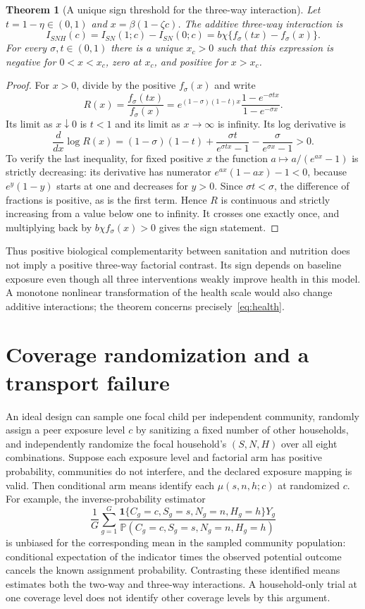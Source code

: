 \documentclass[11pt,a4paper]{article}
\newtheorem{theorem}{Theorem}[section]
\theoremstyle{definition}
\theoremstyle{remark}
\newcommand{\Prb}{\mathbb P}
\newcommand{\ind}{\mathbf 1}
\begin{document}
\begin{theorem}[A unique sign threshold for the three-way interaction]\label{th:three}
Let $t=1-\eta\in(0,1)$ and $x=\beta(1-\zeta c)$. The additive three-way interaction is
\[
 I_{SNH}(c)=I_{SN}(1;c)-I_{SN}(0;c)
          =b\chi\{f_\sigma(tx)-f_\sigma(x)\}.
\]
For every $\sigma,t\in(0,1)$ there is a unique $x_c>0$ such that this expression is negative for $0<x<x_c$, zero at $x_c$, and positive for $x>x_c$.
\end{theorem}
\begin{proof}
For $x>0$, divide by the positive $f_\sigma(x)$ and write
\[
 R(x)=\frac{f_\sigma(tx)}{f_\sigma(x)}
 =e^{(1-\sigma)(1-t)x}
       \frac{1-e^{-\sigma tx}}{1-e^{-\sigma x}}.
\]
Its limit as $x\downarrow0$ is $t<1$ and its limit as $x\to\infty$ is infinity. Its log derivative is
\[
 \frac{d}{dx}\log R(x)
 =(1-\sigma)(1-t)+\frac{\sigma t}{e^{\sigma tx}-1}
                         -\frac{\sigma}{e^{\sigma x}-1}>0.
\]
To verify the last inequality, for fixed positive $x$ the function
$a\mapsto a/(e^{ax}-1)$ is strictly decreasing: its derivative has numerator $e^{ax}(1-ax)-1<0$, because $e^y(1-y)$ starts at one and decreases for $y>0$. Since $\sigma t<\sigma$, the difference of fractions is positive, as is the first term. Hence $R$ is continuous and strictly increasing from a value below one to infinity. It crosses one exactly once, and multiplying back by $b\chi f_\sigma(x)>0$ gives the sign statement.
\end{proof}

Thus positive biological complementarity between sanitation and nutrition does not imply a positive three-way factorial contrast. Its sign depends on baseline exposure even though all three interventions weakly improve health in this model. A monotone nonlinear transformation of the health scale would also change additive interactions; the theorem concerns precisely~\eqref{eq:health}.

\section{Coverage randomization and a transport failure}
An ideal design can sample one focal child per independent community, randomly assign a peer exposure level $c$ by sanitizing a fixed number of other households, and independently randomize the focal household's $(S,N,H)$ over all eight combinations. Suppose each exposure level and factorial arm has positive probability, communities do not interfere, and the declared exposure mapping is valid. Then conditional arm means identify each $\mu(s,n,h;c)$ at randomized $c$. For example, the inverse-probability estimator
\[
 \frac1G\sum_{g=1}^G
 \frac{\ind\{C_g=c,S_g=s,N_g=n,H_g=h\}Y_g}
 {\Prb(C_g=c,S_g=s,N_g=n,H_g=h)}
\]
is unbiased for the corresponding mean in the sampled community population: conditional expectation of the indicator times the observed potential outcome cancels the known assignment probability. Contrasting these identified means estimates both the two-way and three-way interactions. A household-only trial at one coverage level does not identify other coverage levels by this argument.
\end{document}
